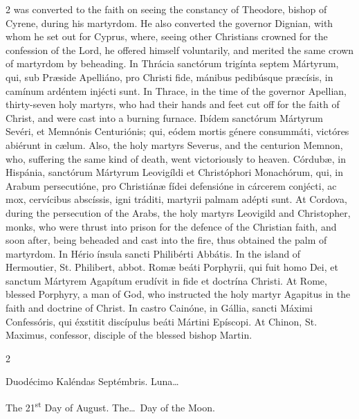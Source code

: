 \begin{paracol}{2}
 was converted to the faith on seeing the constancy of Theodore, bishop of 
 Cyrene, during his martyrdom. He also converted the governor Dignian, 
 with whom he set out for Cyprus, where, seeing other Christians crowned for 
 the confession of the Lord, he offered himself voluntarily, and merited the 
 same crown of martyrdom by beheading.
\switchcolumn*
{}
In Thrácia sanctórum 
 trigínta septem Mártyrum, qui, sub Præside Apelliáno, pro Christi fide, 
 mánibus pedibúsque præcísis, in camínum ardéntem injécti sunt.
\switchcolumn
{}
In Thrace, in the time of the 
 governor Apellian, thirty-seven holy martyrs, who had their hands and feet 
 cut off for the faith of Christ, and were cast into a burning furnace.
\switchcolumn*
{}
Ibídem sanctórum 
 Mártyrum Sevéri, et Memnónis Centuriónis; qui, eódem mortis génere 
 consummáti, victóres abiérunt in cælum.
\switchcolumn
{}
Also, the holy martyrs Severus, and 
 the centurion Memnon, who, suffering the same kind of death, went 
 victoriously to heaven.
\switchcolumn*
{}
Córdubæ, in Hispánia, 
 sanctórum Mártyrum Leovigíldi et Christóphori Monachórum, qui, in Arabum 
 persecutióne, pro Christiánæ fídei defensióne in cárcerem conjécti, ac mox, 
 cervícibus abscíssis, igni tráditi, martyrii palmam adépti sunt.
\switchcolumn
{}
At Cordova, during the persecution 
 of the Arabs, the holy martyrs Leovigild and Christopher, monks, who were 
 thrust into prison for the defence of the Christian faith, and soon after, 
 being beheaded and cast into the fire, thus obtained the palm of martyrdom.
\switchcolumn*
{}
In Hério ínsula sancti 
 Philibérti Abbátis.
\switchcolumn
{}
In the island of Hermoutier, St. 
 Philibert, abbot.
\switchcolumn*
{}
Romæ beáti Porphyrii, 
 qui fuit homo Dei, et sanctum Mártyrem Agapítum erudívit in fide et doctrína 
 Christi.
\switchcolumn
{}
At Rome, blessed Porphyry, a man of 
 God, who instructed the holy martyr Agapitus in the faith and doctrine of 
 Christ.
\switchcolumn*
{}
In castro Cainóne, in 
 Gállia, sancti Máximi Confessóris, qui éxstitit discípulus beáti Mártini 
 Epíscopi.
\switchcolumn
{}
At Chinon, St. Maximus, confessor, 
 disciple of the blessed bishop Martin.
\switchcolumn*
{}
\end{paracol}


\begin{paracol}{2}
\begin{center}{\color{gregoriocolor} Duodécimo Kaléndas Septémbris. 
 Luna\dots\ }\end{center}
\switchcolumn
{}
\begin{center}{\color{gregoriocolor} The 
 21\textsuperscript{st} Day of 
 August. The\dots\ Day of the Moon.}\end{center}
\end{paracol}

